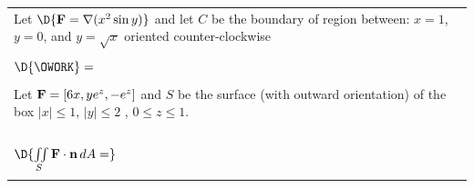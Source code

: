 \documentclass[12pt]{amsart}
\numberwithin{equation}{section}
\begin{document}
\begin{tabular}{| p{19cm} |}
	Let $\D{{\bf F} = \nabla(x^2\sin y)}$ and let $C$ be the boundary of region between: $x=1$, $y=0$, and $y=\sqrt{x}$ oriented counter-clockwise\\
	\\
	\quad $\D{\OWORK} = $
	\\
	\hline
	\\
	Let $\text{\bf F} = [6x,ye^z,-e^z]$ and $S$ be the surface (with outward orientation) of the box $|x|\le 1$, $|y|\le 2$ , $0\le z \le 1$.
	\\ \\ \\ \\ \\
	$\D{\iint \limits_{S} \text{\bf F}\cdot \text{\bf n} \, dA =}$
	\\ \\
	\hline
\end{tabular}

\thispagestyle{empty}
\newpage
\thispagestyle{empty}
\end{document}
